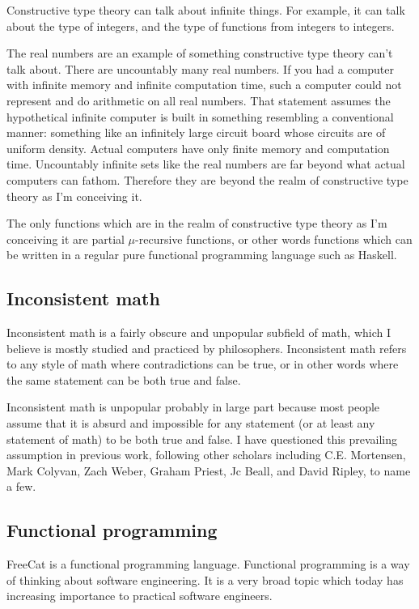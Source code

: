 \documentclass{article}
\begin{document}
Constructive type theory can talk about infinite things. For example, it can talk about the type of integers, and the type of functions from integers to integers.

The real numbers are an example of something constructive type theory can't talk about. There are uncountably many real numbers. If you had a computer with infinite memory and infinite computation time, such a computer could not represent and do arithmetic on all real numbers. That statement assumes the hypothetical infinite computer is built in something resembling a conventional manner: something like an infinitely large circuit board whose circuits are of uniform density. Actual computers have only finite memory and computation time. Uncountably infinite sets like the real numbers are far beyond what actual computers can fathom. Therefore they are beyond the realm of constructive type theory as I'm conceiving it.

The only functions which are in the realm of constructive type theory as I'm conceiving it are partial $\mu$-recursive functions, or other words functions which can be written in a regular pure functional programming language such as Haskell.

\subsection{Inconsistent math}

Inconsistent math is a fairly obscure and unpopular subfield of math, which I believe is mostly studied and practiced by philosophers. Inconsistent math refers to any style of math where contradictions can be true, or in other words where the same statement can be both true and false.

Inconsistent math is unpopular probably in large part because most people assume that it is absurd and impossible for any statement (or at least any statement of math) to be both true and false. I have questioned this prevailing assumption in previous work, following other scholars including C.E. Mortensen, Mark Colyvan, Zach Weber, Graham Priest, Jc Beall, and David Ripley, to name a few.

\subsection{Functional programming}

FreeCat is a functional programming language. Functional programming is a way of thinking about software engineering. It is a very broad topic which today has increasing importance to practical software engineers.
\end{document}
